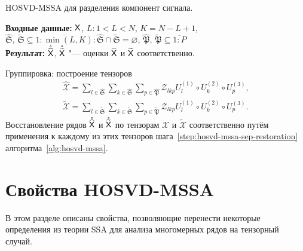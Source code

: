 \documentclass[specialist,
    substylefile=spbu.rtx,
    subf,href,colorlinks=true, 12pt]{disser}
\theoremstyle{plain}
\theoremstyle{definition}
\theoremstyle{remark}
\newcommand{\Input}{\textbf{Входные данные: }}
\newcommand{\Output}{\textbf{Результат: }}
\begin{document}
    \begin{algorithm}[!ht]
        \caption{HOSVD-MSSA для разделения компонент сигнала.}
        \label{alg:hosvd-mssa-sep}
        \Input $\mathsf{X}$,
        $L: 1< L < N$, $K = N - L + 1$,
        $\widehat{\mathfrak{S}},\, \widetilde{\mathfrak{S}} \subseteq \overline{1:\min(L, K)}:
        \widehat{\mathfrak{S}} \cap \widetilde{\mathfrak{S}} = \varnothing$,
        $\widehat{\mathfrak{P}},\, \widetilde{\mathfrak{P}}  \subseteq \overline{1:P}$\\
        \Output $\mathring{\widehat{\mathsf{X}}}$, $\mathring{\widetilde{\mathsf{X}}}$ "--- оценки $\widehat{\mathsf{X}}$ и $\widetilde{\mathsf{X}}$
        соответственно.
        \begin{algorithmic}[1]
            \setcounter{ALG@line}{2}
            \State Группировка: построение тензоров
            \begin{gather*}
                \widehat{\mathcal{X}}=\sum_{l \in \widehat{\mathfrak{S}}} \sum_{k\in \widehat{\mathfrak{S}}}
                \sum_{p\in \widehat{\mathfrak{P}}}
                \mathcal{Z}_{lkp} U^{(1)}_{l}\circ U^{(2)}_{k} \circ U^{(3)}_{p},\\
                \widetilde{\mathcal{X}}=\sum_{l \in \widetilde{\mathfrak{S}}} \sum_{k\in \widetilde{\mathfrak{S}}}
                \sum_{p\in \widetilde{\mathfrak{P}}}
                \mathcal{Z}_{lkp} U^{(1)}_{l}\circ U^{(2)}_{k} \circ U^{(3)}_{p}.
            \end{gather*}
            \State Восстановление рядов $\mathring{\widehat{\mathsf{X}}}$ и $\mathring{\widetilde{\mathsf{X}}}$ по тензорам $\widehat{\mathcal{X}}$ и $\widetilde{\mathcal{X}}$ соответственно путём применения к
            каждому из этих тензоров шага~\ref{step:hosvd-mssa-sep-restoration} алгоритма~\ref{alg:hosvd-mssa}.
        \end{algorithmic}
    \end{algorithm}


    \section{Свойства HOSVD-MSSA}\label{sec:hosvd-mssa-properties}
    В этом разделе описаны свойства, позволяющие перенести некоторые определения из теории SSA для анализа многомерных
    рядов на тензорный случай.
\end{document}
